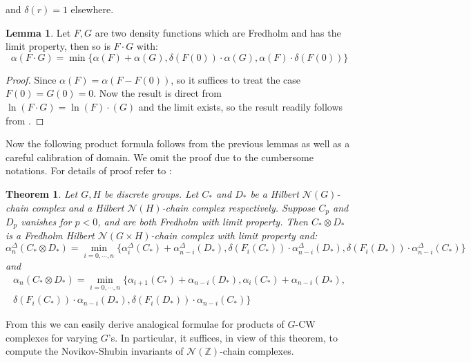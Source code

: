 \documentclass[11pt]{report}
\theoremstyle{definition}
\newtheorem{Lemma}[Def]{Lemma}
\theoremstyle{plain}
\newtheorem{Theo}[Def]{Theorem}
\newcommand{\integer}{\mathbb{Z}}
\newcommand{\vna}{\mathcal{N}}
\begin{document}
and $\delta(r)=1$ elsewhere.
\begin{Lemma}
	Let $F,G$ are two density functions which are Fredholm and has the limit property, then so is $F\cdot G$ with:
	\begin{equation}
	\alpha(F\cdot G)=\min\{\alpha(F)+\alpha(G), \delta(F(0))\cdot \alpha(G), \alpha(F)\cdot \delta(F(0))\}
	\end{equation}
\end{Lemma}
\begin{proof}
	Since $\alpha(F)=\alpha(F-F(0))$, so it suffices to treat the case $F(0)=G(0)=0$. Now the result is direct from $\ln(F\cdot G)=\ln(F)\cdot (G)$ and the limit exists, so the result readily follows from .
\end{proof}
Now the following product formula follows from the previous lemmas as well as a careful calibration of domain. We omit the proof due to the cumbersome notations. For details of proof refer to \cite[Lemma~2.35]{luck2013}:
\begin{Theo}\label{2.44}
	Let $G, H$ be discrete groups. Let $C_*$ and $D_*$ be a Hilbert $\vna(G)$-chain complex and a Hilbert $\vna(H)$-chain complex respectively. Suppose $C_p$ and $D_p$ vanishes for $p<0$, and are both Fredholm with limit property. Then $C_*\otimes D_*$ is a Fredholm Hilbert $\vna(G\times H)$-chain complex with limit property and:
	\begin{equation}
	\alpha^\Delta_n(C_*\otimes D_*)=\min_{i=0,\cdots, n}\{\alpha^\Delta_i(C_*)+\alpha^\Delta_{n-i}(D_*), \delta(F_i(C_*))\cdot \alpha^\Delta_{n-i}(D_*), \delta(F_i(D_*))\cdot \alpha^\Delta_{n-i}(C_*)\}
	\end{equation}
	and
	\begin{multline}
	\alpha_n(C_*\otimes D_*)=\min_{i=0,\cdots, n}\{\alpha_{i+1}(C_*)+\alpha_{n-i}(D_*),
	\alpha_{i}(C_*)+\alpha_{n-i}(D_*),\\
	  \delta(F_i(C_*))\cdot \alpha_{n-i}(D_*), \delta(F_i(D_*))\cdot \alpha_{n-i}(C_*)\}
	\end{multline}
\end{Theo} 
From this we can easily derive  analogical formulae for products of $G$-CW complexes for varying $G$'s. In particular, it suffices, in view of this theorem, to compute the Novikov-Shubin invariants of $\vna(\integer)$-chain complexes.
\end{document}
